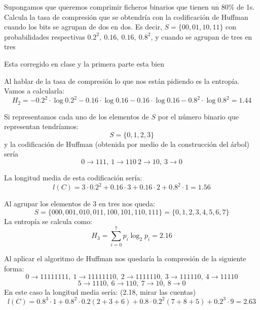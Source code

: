 \begin{problem}[13]
Supongamos que queremos comprimir ficheros binarios que tienen un 80\% de 1s. Calcula la tasa de compresión que se obtendría con la codificación de Huffman cuando los bits se agrupan de dos en dos. Es decir, $S=\{00,01,10,11\}$ con probabilidades respectivas $0.2^2, \ 0.16, \ 0.16, \ 0.8^2$, y cuando se agrupan de tres en tres
\solution

\yoP

Esta corregido en clase y la primera parte esta bien

Al hablar de la tasa de compresión lo que nos están pidiendo es la entropía. Vamos a calcularla:
\[H_2=-0.2^2 \cdot  \log 0.2^2-0.16\cdot \log 0.16 -0.16\cdot \log 0.16- 0.8^2\cdot \log 0.8^2 = 1.44\]

Si representamos cada uno de los elementos de $S$ por el número binario que representan tendríamos:
\[S=\{0,1,2,3\}\]
y la codificación de Huffman (obtenida por medio de la construcción del árbol) sería
\[0 \to 111, \  1\to 110 \ 2 \to 10, \ 3 \to  0\]

La longitud media de esta codificación sería:
\[l(C)=3\cdot 0.2^2+0.16\cdot 3+0.16\cdot 2+0.8^2\cdot 1 = 1.56\]

Al agrupar los elementos de 3 en tres nos queda:
\[S=\{000,001,010,011,100,101,110,111\} = \{0,1,2,3,4,5,6,7\}\]
La entropía se calcula como:
\[H_3=\sum_{i=0}^7 p_i\log_2 p_i =2.16\]

Al aplicar el algoritmo de Huffman nos quedaría la compresión de la siguiente forma:
\[0 \to 11111111, \ 1 \to 11111110, \ 2 \to 1111110, \ 3 \to 111110, \ 4\to 11110\]
\[5\to 1110, \ 6 \to 110, \ 7\to 10, \ 8 \to 0\]
En este caso la longitud media sería: (2.18, mirar las cuentas)
\[l(C)=0.8^3\cdot 1+0.8^2\cdot 0.2(2+3+6)+0.8\cdot 0.2^2(7+8+5)+0.2^3\cdot 9=2.63\]

\end{problem}

